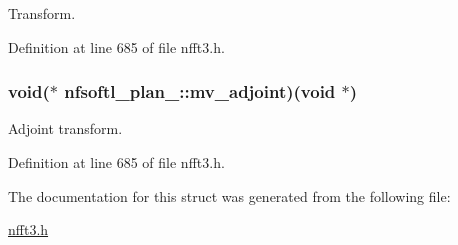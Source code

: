 Transform. 



Definition at line 685 of file nfft3.\-h.

\hypertarget{structnfsoftl__plan___a2f7123e0975b4a7cd693d01abf117949}{
\subsubsection[{mv\-\_\-adjoint}]{\setlength{\rightskip}{0pt plus 5cm}void($\ast$ nfsoftl\-\_\-plan\-\_\-\-::mv\-\_\-adjoint)(void $\ast$)}}\label{structnfsoftl__plan___a2f7123e0975b4a7cd693d01abf117949}


Adjoint transform. 



Definition at line 685 of file nfft3.\-h.



The documentation for this struct was generated from the following file\-:\begin{DoxyCompactItemize}
\item 
\hyperlink{nfft3_8h}{nfft3.\-h}\end{DoxyCompactItemize}
